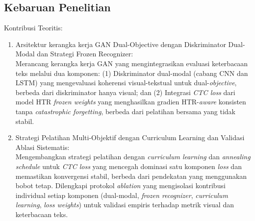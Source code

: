 

\vspace{0.8em}
\subsection{Kebaruan Penelitian}
\label{subsec:kebaruan}

Kontribusi Teoritis:
\begin{enumerate}[label=\arabic*., leftmargin=1cm]
    \item Arsitektur kerangka kerja GAN Dual-Objective dengan Diskriminator Dual-Modal dan Strategi Frozen Recognizer: \\
    Merancang kerangka kerja GAN yang mengintegrasikan evaluasi keterbacaan teks melalui dua komponen: (1) Diskriminator dual-modal (cabang CNN dan LSTM) yang mengevaluasi koherensi visual-tekstual untuk dual-\textit{objective}, berbeda dari diskriminator hanya visual; dan (2) Integrasi \textit{CTC loss} dari model HTR \textit{frozen weights} yang menghasilkan gradien HTR-\textit{aware} konsisten tanpa \textit{catastrophic forgetting}, berbeda dari pelatihan bersama yang tidak stabil.

    \item Strategi Pelatihan Multi-Objektif dengan Curriculum Learning dan Validasi Ablasi Sistematis: \\
    Mengembangkan strategi pelatihan dengan \textit{curriculum learning} dan \textit{annealing schedule} untuk \textit{CTC loss} yang mencegah dominasi satu komponen \textit{loss} dan memastikan konvergensi stabil, berbeda dari pendekatan yang menggunakan bobot tetap. Dilengkapi protokol \textit{ablation} yang mengisolasi kontribusi individual setiap komponen (dual-modal, \textit{frozen recognizer}, \textit{curriculum learning}, \textit{loss weights}) untuk validasi empiris terhadap metrik visual dan keterbacaan teks.


\end{enumerate}

